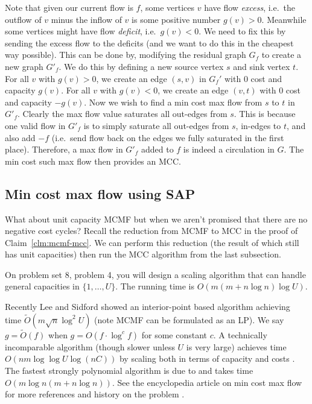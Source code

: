 \documentclass[11pt]{article}
\begin{document}
Note that given our current flow is $f$, some vertices $v$ have flow {\em excess}, i.e.\ the outflow of $v$ minus the inflow of $v$ is some positive number $g(v) > 0$. Meanwhile some vertices might have flow {\em deficit}, i.e.\ $g(v) < 0$. We need to fix this by sending the excess flow to the deficits (and we want to do this in the cheapest way possible). This can be done by, modifying the residual graph $G_f$ to create a new graph $G'_f$. We do this by defining a new source vertex $s$ and sink vertex $t$. For all $v$ with $g(v) > 0$, we create an edge $(s,v)$ in $G_f'$ with $0$ cost and capacity $g(v)$. For all $v$ with $g(v) < 0$, we create an edge $(v,t)$ with $0$ cost and capacity $-g(v)$. Now we wish to find a min cost max flow from $s$ to $t$ in $G'_f$. Clearly the max flow value saturates all out-edges from $s$. This is because one valid flow in $G'_f$ is to simply saturate all out-edges from $s$, in-edges to $t$, and also add $-f$ (i.e.\ send flow back on the edges we fully saturated in the first place). Therefore, a max flow in $G'_f$ added to $f$ is indeed a circulation in $G$. The min cost such max flow then provides an MCC.

\subsection{Min cost max flow using SAP}
What about unit capacity MCMF but when we aren't promised that there are no negative cost cycles? Recall the reduction from MCMF to MCC in the proof of Claim~\ref{clm:mcmf-mcc}. We can perform this reduction (the result of which still has unit capacities) then run the MCC algorithm from the last subsection.

On problem set 8, problem 4, you will design a scaling algorithm that can handle general capacities in $\{1,\ldots,U\}$. The running time is $O(m(m+n\log n)\log U)$.

Recently Lee and Sidford showed an interior-point based algorithm achieving time $\tilde{O}(m\sqrt{n}\log^2 U)$ (note MCMF can be formulated as an LP). We say $g = \tilde{O}(f)$ when $g = O(f \cdot \log^c f)$ for some constant $c$. A technically incomparable algorithm (though slower unless $U$ is very large) achieves time $O(nm\log\log U\log(nC))$ by scaling both in terms of capacity and costs \cite{AGOT92}. The fastest strongly polynomial algorithm is due to \cite{Orlin93} and takes time $O(m\log n(m + n\log n))$. See the encyclopedia article on min cost max flow for more references and history on the problem \cite{AMO09}.
\end{document}
